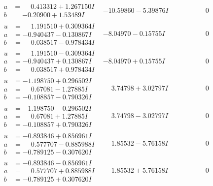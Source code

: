 \documentclass[1p]{elsarticle_modified}
\theoremstyle{definition}
\begin{document}
$$\begin{array}{c|c|c}
\begin{aligned}
a &= \phantom{-}0.413312 + 1.267150 I \\
b &= -0.20900 + 1.53489 I\end{aligned}
 & -10.59860 - 5.39876 I & \phantom{-0.000000 } 0 \\ \hline\begin{aligned}
u &= \phantom{-}1.191510 + 0.309364 I \\
a &= -0.940437 - 0.130867 I \\
b &= \phantom{-}0.038517 - 0.978434 I\end{aligned}
 & -8.04970 - 0.15755 I & \phantom{-0.000000 } 0 \\ \hline\begin{aligned}
u &= \phantom{-}1.191510 - 0.309364 I \\
a &= -0.940437 + 0.130867 I \\
b &= \phantom{-}0.038517 + 0.978434 I\end{aligned}
 & -8.04970 + 0.15755 I & \phantom{-0.000000 } 0 \\ \hline\begin{aligned}
u &= -1.198750 + 0.296502 I \\
a &= \phantom{-}0.67081 - 1.27885 I \\
b &= -0.108857 - 0.790326 I\end{aligned}
 & \phantom{-}3.74798 + 3.02797 I & \phantom{-0.000000 } 0 \\ \hline\begin{aligned}
u &= -1.198750 - 0.296502 I \\
a &= \phantom{-}0.67081 + 1.27885 I \\
b &= -0.108857 + 0.790326 I\end{aligned}
 & \phantom{-}3.74798 - 3.02797 I & \phantom{-0.000000 } 0 \\ \hline\begin{aligned}
u &= -0.893846 + 0.856961 I \\
a &= \phantom{-}0.577707 - 0.885988 I \\
b &= -0.789125 - 0.307620 I\end{aligned}
 & \phantom{-}1.85532 - 5.76158 I & \phantom{-0.000000 } 0 \\ \hline\begin{aligned}
u &= -0.893846 - 0.856961 I \\
a &= \phantom{-}0.577707 + 0.885988 I \\
b &= -0.789125 + 0.307620 I\end{aligned}
 & \phantom{-}1.85532 + 5.76158 I & \phantom{-0.000000 } 0\\

\end{array}$$
\end{document}
